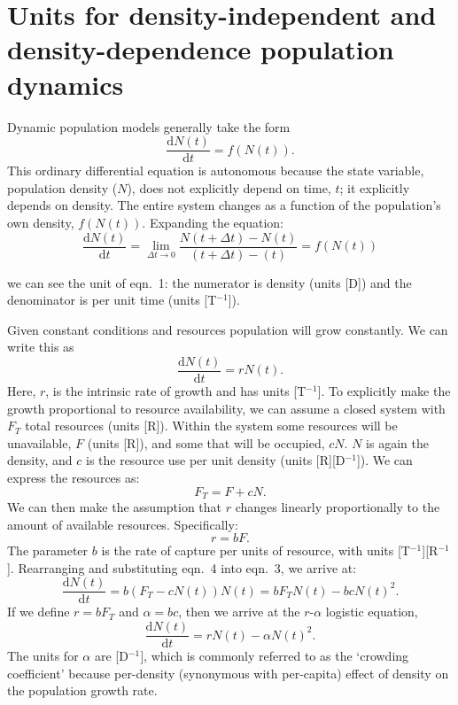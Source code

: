 \documentclass[11pt]{article}
\begin{document}
\section{Units for density-independent and density-dependence population dynamics}
Dynamic population models generally take the form
    \begin{equation}
    \frac{\mathrm{d}N(t)}{\mathrm{d}t} = f(N(t)).
    \end{equation}
This ordinary differential equation is autonomous because the state variable, population density ($N$), does not explicitly depend on time, $t$; it explicitly depends on density. The entire system changes as a function of the population's own density, $f(N(t))$. Expanding the equation:
    \begin{equation}
    \frac{\mathrm{d}N(t)}{\mathrm{d}t} = \lim_{\Delta t \to 0} \frac{N(t + \Delta t) - N(t)}{(t + \Delta t) - (t)} = f(N(t))
    \end{equation}

we can see the unit of eqn.~1: the numerator is density (units [D]) and the denominator is per unit time (units [T$^{-1}$]).\par

Given constant conditions and resources population will grow constantly. We can write this as
    \begin{equation}
    \frac{\mathrm{d}N(t)}{\mathrm{d}t} = rN(t).
    \end{equation}
Here, $r$, is the intrinsic rate of growth and has units [T$^{-1}$]. To explicitly make the growth proportional to resource availability, we can assume a closed system with $F_T$ total resources (units [R]). Within the system some resources will be unavailable, $F$ (units [R]), and some that will be occupied, $cN$. $N$ is again the density, and $c$ is the resource use per unit density (units [R][D$^{-1}$]). We can express the resources as:
    \begin{equation}
    F_T = F + cN.
    \end{equation}
We can then make the assumption that $r$ changes linearly proportionally to the amount of available resources. Specifically:
    \begin{equation}
    r = bF.
    \end{equation}
The parameter $b$ is the rate of capture per units of resource, with units [T$^{-1}$][R$^{-1}$]. Rearranging and substituting eqn.~4 into eqn.~3, we arrive at:
    \begin{equation}
    \frac{\mathrm{d}N(t)}{\mathrm{d}t} = b(F_T - cN(t))N(t) =  bF_TN(t) - bcN(t)^2.
    \end{equation}
If we define $r = bF_T$ and $\alpha = bc$, then we arrive at the $r\textrm{-}\alpha$ logistic equation,
    \begin{equation}
    \frac{\mathrm{d}N(t)}{\mathrm{d}t} = rN(t) - \alpha N(t)^2.
    \end{equation}
The units for $\alpha$ are [D$^{-1}]$, which is commonly referred to as the `crowding coefficient' because per-density (synonymous with per-capita) effect of density on the population growth rate.
\end{document}
